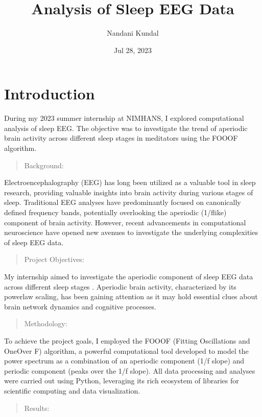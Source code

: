 \documentclass[letterpaper,10pt,english]{sphinxmanual}
\title{Analysis of Sleep EEG Data}
\date{Jul 28, 2023}
\author{Nandani Kundal}
\begin{document}
\pagestyle{empty}
\sphinxmaketitle
\pagestyle{plain}
\sphinxtableofcontents
\pagestyle{normal}
\label{\detokenize{index::doc}}



\chapter{Introduction}
\label{\detokenize{introduction:introduction}}\label{\detokenize{introduction::doc}}
\sphinxAtStartPar
During my 2023 summer internship at NIMHANS, I explored computational analysis of sleep EEG. The objective was to investigate the trend of aperiodic brain activity across different sleep stages in meditators using the FOOOF algorithm.
\begin{quote}

\sphinxAtStartPar
Background:
\end{quote}

\sphinxAtStartPar
Electroencephalography (EEG) has long been utilized as a valuable tool in sleep research, providing valuable insights into brain activity during various stages of sleep. Traditional EEG analyses have predominantly focused on canonically defined frequency bands, potentially overlooking the aperiodic (1/f\sphinxhyphen{}like) component of brain activity. However, recent advancements in computational neuroscience have opened new avenues to investigate the underlying complexities of sleep EEG data.
\begin{quote}

\sphinxAtStartPar
Project Objectives:
\end{quote}

\sphinxAtStartPar
My internship aimed to investigate the aperiodic component of sleep EEG data across different sleep stages . Aperiodic brain activity, characterized by its power\sphinxhyphen{}law scaling, has been gaining attention as it may hold essential clues about brain network dynamics and cognitive processes.
\begin{quote}

\sphinxAtStartPar
Methodology:
\end{quote}

\sphinxAtStartPar
To achieve the project goals, I employed the FOOOF (Fitting Oscillations and One\sphinxhyphen{}Over F) algorithm, a powerful computational tool developed to model the power spectrum as a combination of an aperiodic component (1/f slope) and periodic component (peaks over the 1/f slope). All data processing and analyses were carried out using Python, leveraging its rich ecosystem of libraries for scientific computing and data visualization.
\begin{quote}

\sphinxAtStartPar
Results:
\end{quote}
\end{document}
